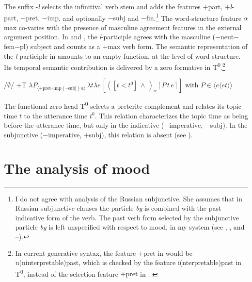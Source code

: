 \documentclass[output=paper,colorlinks,citecolor=brown]{langscibook}
\begin{document}
\begin{otherlanguage}{english}
\noindent The suffix -\textit{l} selects the infinitival verb stem and adds the features {$+$part}, {$+$\textit{l}-part}, {$+$pret}, {$-$imp}, and optionally {$-$subj} and {$-$fin}.\footnote{I do not agree with  analysis of the Russian subjunctive. She assumes that in Russian subjunctive clauses the particle \textit{by} is combined with the past indicative form of the verb. The past verb form selected by the subjunctive particle \textit{by} is left unspecified with respect to mood, in my system (see , , and --).
} The word-structure feature $\alpha$max co-varies with the presence of masculine agreement features in the external argument position. In  and , the \textit{l}-participle agrees with the masculine \mbox{($-$neut$-$fem$-$pl)} subject and counts as a {$+$max} verb form. The semantic representation of the \textit{l}-participle in  amounts to an empty function, at the level of word structure.  Its temporal semantic contribution is delivered by a zero formative in T\textsuperscript{0}.\footnote{In current generative syntax, the feature {$+$pret} in  would be u(ninterpretable)past, which is checked by the feature i(nterpretable)past in T\textsuperscript{0}, instead of the selection feature {$+$pret} in . \label{footnote11}
}

\begin{exe}
\ex	\label{ex:16:6}
\begin{xlist}
	\ex /$\emptyset$/
    \ex +T
    \ex $\lambda P _{\langle +\text{pret}–\text{imp}(–\text{subj})\alpha \rangle} \, \lambda t\lambda e \, [([t < t^0] \, \wedge \, )_{\alpha}[P\,t\,e]] $ \newline
    with $P \in \langle e \langle et \rangle\rangle$ \label{ex:16:6c}
\end{xlist}
\end{exe}

\noindent The functional zero head T\textsuperscript{0} selects a preterite complement and relates its topic time $t$ to the utterance time $t^0$. This relation characterizes the topic time as being before the utterance time, but only in the indicative ({$-$imperative}, {$-$subj}). In the subjunctive ({$-$imperative}, {$+$subj}), this relation is absent (see ). 

\section{The analysis of mood}


\end{otherlanguage}
\end{document}

